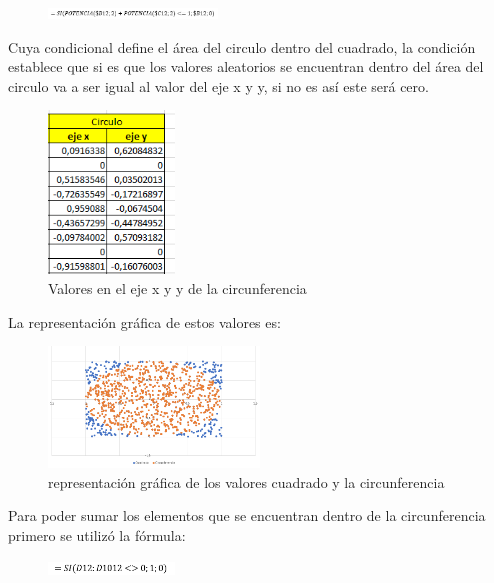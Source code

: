 \documentclass[letterpaper, 10 pt, conference]{ieeeconf}
\begin{document}
\begin{figure}[!ht]
\centering
\includegraphics[width=0.4\textwidth]{images/form2.png}
\label{fig:estructurados}
\end{figure}          
Cuya condicional define el área del circulo dentro del cuadrado, la condición establece que si es que los valores aleatorios se encuentran dentro del área del circulo va a ser igual al valor del eje x y y, si no es así este será cero.
\begin{figure}[!ht]
\centering
\includegraphics[width=0.3\textwidth]{images/circun.png}
\caption{Valores en el eje x y y de la circunferencia}
\label{fig:estructurados}
\end{figure}
\newline
La representación gráfica de estos valores es:
\begin{figure}[!ht]
\centering
\includegraphics[width=0.5\textwidth]{images/graffinal.png}
\caption{representación gráfica de los valores cuadrado y la circunferencia}
\label{fig:estructurados}
\end{figure}
\newline
Para poder sumar los elementos que se encuentran dentro de la circunferencia primero se utilizó la fórmula:
\begin{figure}[!ht]
\centering
\includegraphics[width=0.3\textwidth]{images/form3.png}
\label{fig:estructurados}
\end{figure}
\end{document}
